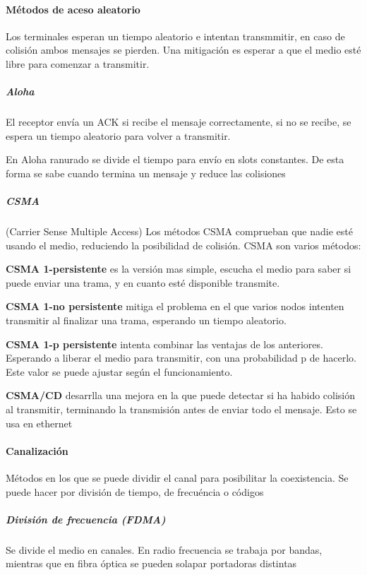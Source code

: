         \paragraph{Métodos de aceso aleatorio}
            Los terminales esperan un tiempo aleatorio e intentan transmmitir, en caso de colisión ambos mensajes se pierden. Una mitigación es esperar a que el medio esté libre para comenzar a transmitir.

            \subparagraph{Aloha}
                El receptor envía un ACK si recibe el mensaje correctamente, si no se recibe, se espera un tiempo aleatorio para volver a transmitir. 

                En Aloha ranurado se divide el tiempo para envío en slots constantes. De esta forma se sabe cuando termina un mensaje y reduce las colisiones

            \subparagraph{CSMA}
                (Carrier Sense Multiple Access) Los métodos CSMA comprueban que nadie esté usando el medio, reduciendo la posibilidad de colisión. CSMA son varios métodos:

                \textbf{CSMA 1-persistente} es la versión mas simple, escucha el medio para saber si puede enviar una trama, y en cuanto esté disponible transmite.

                \textbf{CSMA 1-no persistente} mitiga el problema en el que varios nodos intenten transmitir al finalizar una trama, esperando un tiempo aleatorio.

                \textbf{CSMA 1-p persistente} intenta combinar las ventajas de los anteriores. Esperando a liberar el medio para transmitir, con una probabilidad p de hacerlo. Este valor se puede ajustar según el funcionamiento.

                \textbf{CSMA/CD} desarrlla una mejora en la que puede detectar si ha habido colisión al transmitir, terminando la transmisión antes de enviar todo el mensaje. Esto se usa en ethernet

        \paragraph{Canalización}
            Métodos en los que se puede dividir el canal para posibilitar la coexistencia. Se puede hacer por división de tiempo, de frecuéncia o códigos

            \subparagraph{División de frecuencia (FDMA)}
                Se divide el medio en canales. En radio frecuencia se trabaja por bandas, mientras que en fibra óptica se pueden solapar portadoras distintas

